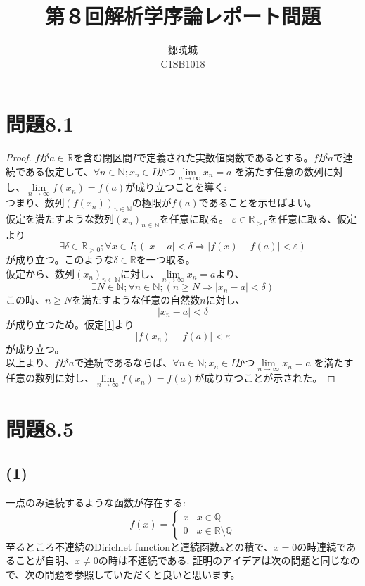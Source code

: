 \documentclass{jarticle}
\begin{document}
\title{第８回解析学序論レポート問題}
\author{鄒暁城 \\ C1SB1018}
\maketitle
\newpage
\tableofcontents
{}
\newpage
\section{問題8.1}
\begin{proof}
$f$が$a \in \mathbb{R}$を含む閉区間$I$で定義された実数値関数であるとする。$f$が$a$で連続である仮定して、$\forall n \in \mathbb{N} ; x_n \in I$かつ$\lim\limits_{n \to \infty} x_n =a$
を満たす任意の数列に対し、$\lim\limits_{n \to \infty} f(x_n) =f(a)$が成り立つことを導く:\\
	つまり、数列$\left( f(x_n) \right)_{n \in \mathbb{N}}$の極限が$f(a)$であることを示せばよい。\\
仮定を満たすような数列$(x_n)_{n\in \mathbb{N}}$を任意に取る。
$\varepsilon \in \mathbb{R}_{>0}$を任意に取る、仮定より
\begin{equation}
	\exists \delta \in \mathbb{R}_{>0}; \forall x \in I ; \left( |x-a|<\delta \Rightarrow |f(x) - f(a)| <  \varepsilon \right) \label{1}
\end{equation}
が成り立つ。このような$\delta \in \mathbb{R} $を一つ取る。\\
仮定から、数列$(x_n)_{n\in \mathbb{N}}$に対し、$\lim\limits_{n\to \infty} x_n =a$より、\\
$$
	\exists N \in \mathbb{N}; \forall n \in \mathbb{N} ; ( n \ge N \Rightarrow  |x_n -a | < \delta )
$$
この時、$n \ge N$を満たすような任意の自然数$n$に対し、\\
$$
	|x_n -a| < \delta
$$
	が成り立つため。仮定\ref{1}より\\
$$
	|f(x_n) - f(a)| < \varepsilon
$$
が成り立つ。\\
以上より、$f$が$a$で連続であるならば、$\forall n \in \mathbb{N} ; x_n \in I$かつ$\lim\limits_{n \to \infty} x_n =a$
を満たす任意の数列に対し、$\lim\limits_{n \to \infty} f(x_n) =f(a)$が成り立つことが示された。
\end{proof}
\newpage
\section{問題8.5}
\subsection{(1)}
一点のみ連続するような函数が存在する:
\begin{equation}
	f(x) =
	\begin{cases}
		 x &x \in \mathbb{Q}\\
		 0 &x \in \mathbb{R}\setminus \mathbb{Q}
	\end{cases}
\end{equation}
至るところ不連続のDirichlet functionと連続函数xとの積で、$x=0$の時連続であることが自明、$x \ne 0$の時は不連続である. 証明のアイデアは次の問題と同じなので、次の問題を参照していただくと良いと思います。
\end{document}
